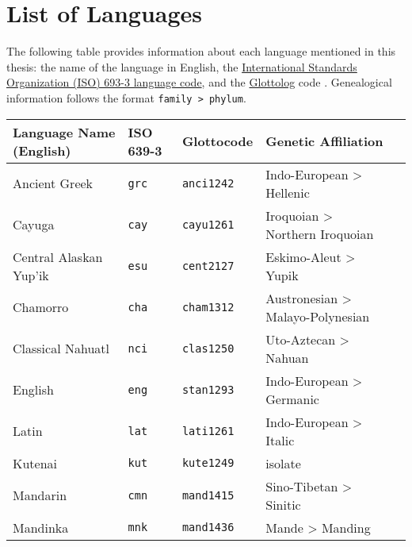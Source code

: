 \chapter*{List of Languages}
\label{ch:languages}

The following table provides information about each language mentioned in this thesis: the name of the language in English, the \href{https://iso639-3.sil.org/}{International Standards Organization (ISO) 693-3 language code}, and the \href{https://glottolog.org/}{Glottolog} code \parencite{HammarstromForkelHaspelmath2019}. Genealogical information follows the format \texttt{family > phylum}.

\renewcommand{\arraystretch}{1}

\begin{table}[h]
  \onehalfspacing
  \begin{tabularx}{\linewidth}{ l l l l l }
    \textbf{Language Name (English)} & \textbf{ISO 639-3} & \textbf{Glottocode} & \textbf{Genetic Affiliation}\\
    \midrule
    Ancient Greek                    & \texttt{grc}       & \texttt{anci1242}   & Indo-European > Hellenic\\
    Cayuga                           & \texttt{cay}       & \texttt{cayu1261}   & Iroquoian > Northern Iroquoian\\
    Central Alaskan Yup'ik           & \texttt{esu}       & \texttt{cent2127}   & Eskimo-Aleut > Yupik\\
    Chamorro                         & \texttt{cha}       & \texttt{cham1312}   & Austronesian > Malayo-Polynesian\\
    Classical Nahuatl                & \texttt{nci}       & \texttt{clas1250}   & Uto-Aztecan > Nahuan\\
    English                          & \texttt{eng}       & \texttt{stan1293}   & Indo-European > Germanic\\
    Latin                            & \texttt{lat}       & \texttt{lati1261}   & Indo-European > Italic\\
    Kutenai                          & \texttt{kut}       & \texttt{kute1249}   & isolate\\
    Mandarin                         & \texttt{cmn}       & \texttt{mand1415}   & Sino-Tibetan > Sinitic\\
    Mandinka                         & \texttt{mnk}       & \texttt{mand1436}   & Mande > Manding\\

\end{tabularx}
\end{table}
